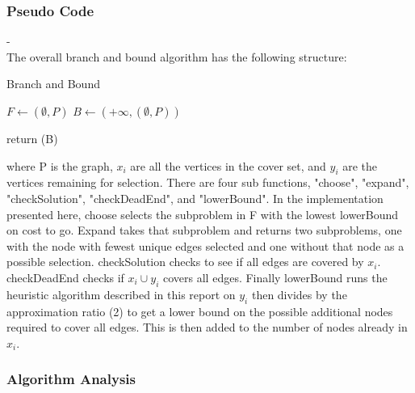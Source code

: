 \documentclass[acmlarge]{acmart}
\begin{document}
\newpage
\subsubsection{Pseudo Code}

-\\

The overall branch and bound algorithm has the following structure:\\

\begin{algorithm}[H]
	\caption{Branch and Bound}
	\SetAlgoLined
	
	$F \leftarrow {(\emptyset,P)}$\;
	$B \leftarrow {(+\infty,(\emptyset,P))}$\;
	
	return (B)
\end{algorithm}

where P is the graph, $x_i$ are all the vertices in the cover set, and $y_i$ are the vertices remaining for selection. There are four sub functions, "choose", "expand", "checkSolution", "checkDeadEnd", and "lowerBound". In the implementation presented here, choose selects the subproblem in F with the lowest lowerBound on cost to go. Expand takes that subproblem and returns two subproblems, one with the node with fewest unique edges selected and one without that node as a possible selection. checkSolution checks to see if all edges are covered by $x_i$. checkDeadEnd checks if $x_i \cup y_i$ covers all edges. Finally lowerBound runs the heuristic algorithm described in this report on $y_i$ then divides by the approximation ratio (2) to get a lower bound on the possible additional nodes required to cover all edges. This is then added to the number of nodes already in $x_i$.




\subsubsection{Algorithm Analysis}


\end{document}
